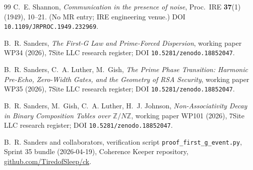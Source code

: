 \documentclass[11pt,reqno]{amsart}
\theoremstyle{definition}
\newcommand{\Z}{\mathbb{Z}}
\begin{document}
\begin{thebibliography}{99}
C.~E. Shannon, \emph{Communication in the presence of noise}, Proc.~IRE
\textbf{37}(1) (1949), 10--21. (No \textsc{MR} entry; IRE engineering
venue.) DOI \texttt{10.1109/JRPROC.1949.232969}.

B.~R. Sanders, \emph{The First-G Law and Prime-Forced Dispersion}, working
paper WP34 (2026), 7Site LLC research register;
DOI \texttt{10.5281/zenodo.18852047}.

B.~R. Sanders, C.~A. Luther, M.~Gish, \emph{The Prime Phase Transition:
Harmonic Pre-Echo, Zero-Width Gates, and the Geometry of RSA Security},
working paper WP35 (2026), 7Site LLC research register;
DOI \texttt{10.5281/zenodo.18852047}.

B.~R. Sanders, M.~Gish, C.~A. Luther, H.~J. Johnson, \emph{Non-Associativity
Decay in Binary Composition Tables over $\Z/N\Z$}, working paper WP101
(2026), 7Site LLC research register; DOI \texttt{10.5281/zenodo.18852047}.

B.~R. Sanders and collaborators, verification script
\texttt{proof\_first\_g\_event.py}, Sprint 35 bundle
(2026-04-19), Coherence Keeper repository,
\href{https://github.com/TiredofSleep/ck}{github.com/TiredofSleep/ck}.

\end{thebibliography}
\end{document}
